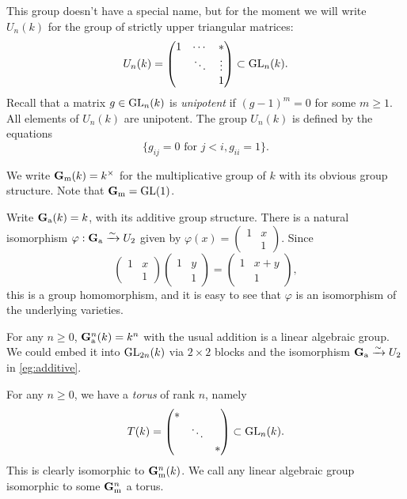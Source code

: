 \begin{example}
This group doesn't have a special name, but for the moment we will write 
$U_n(k)$ for the group of strictly upper triangular matrices: 
\[
  U_n(k) = \begin{pmatrix} 1 & \cdots & \ast \\ & \ddots & \vdots \\ & & 1 \end{pmatrix} \subset \operatorname{GL}_n(k) .
\]
Recall that a matrix $g\in \operatorname{GL}_n(k)$ is \emph{unipotent} if $(g-1)^m=0$ for 
some $m\geqslant 1$. All elements of $U_n(k)$ are unipotent. The group $U_n(k)$ 
is defined by the equations 
\[
  \{g_{i j}=0\text{ for }j<i, g_{ii}=1\} .
\]
\end{example}

\begin{example}[Multiplicative]
We write $\mathbf{G}_\mathrm{m}(k)=k^\times$ for the multiplicative group of $k$ with its obvious 
group structure. Note that $\mathbf{G}_\mathrm{m}=\operatorname{GL}(1)$. 
\end{example}

\begin{example}[Additive]\label{eg:additive}
Write $\mathbf{G}_\mathrm{a}(k)=k$, with its additive group structure. There is a natural 
isomorphism $\varphi:\mathbf{G}_\mathrm{a}\xrightarrow\sim U_2$ given by $\varphi(x)=\begin{pmatrix} 1 & x \\ & 1 \end{pmatrix}$. Since 
\[
  \begin{pmatrix} 1 & x \\ & 1 \end{pmatrix} \begin{pmatrix} 1 & y \\ & 1 \end{pmatrix} = \begin{pmatrix} 1 & x+y \\ & 1 \end{pmatrix} ,
\]
this is a group homomorphism, and it is easy to see that $\varphi$ is an 
isomorphism of the underlying varieties. 
\end{example}

\begin{example}
For any $n\geqslant 0$, $\mathbf{G}_\mathrm{a}^n(k)=k^n$ with the usual addition is a linear 
algebraic group. We could embed it into $\operatorname{GL}_{2n}(k)$ via $2\times 2$ blocks 
and the isomorphism $\mathbf{G}_\mathrm{a}\xrightarrow\sim U_2$ in \autoref{eg:additive}.
\end{example}

\begin{example}[Tori]
For any $n\geqslant 0$, we have a \emph{torus} of rank $n$, namely 
\[
  T(k) = \begin{pmatrix} \ast \\ & \ddots \\ & & \ast \end{pmatrix}\subset \operatorname{GL}_n(k) .
\]
This is clearly isomorphic to $\mathbf{G}_\mathrm{m}^n(k)$. We call any linear algebraic group 
isomorphic to some $\mathbf{G}_\mathrm{m}^n$ a torus.  
\end{example}

